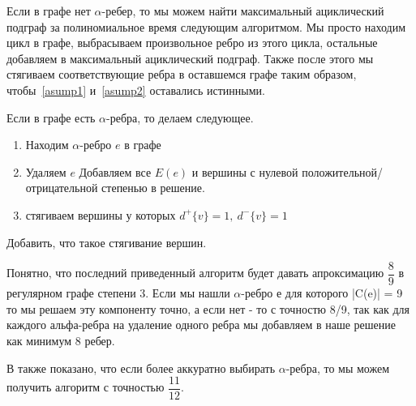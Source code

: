 Если в графе нет $\alpha$-ребер, то мы можем найти максимальный ациклический 
подграф за полиномиальное время следующим алгоритмом. Мы просто находим цикл
в графе, выбрасываем произвольное ребро из этого цикла, остальные добавляем в 
максимальный ациклический подграф. Также после этого мы стягиваем 
соответствующие ребра в оставшемся графе таким образом, чтобы~\ref{asump1}
 и~\ref{asump2} оставались истинными.

Если в графе есть $\alpha$-ребра, то делаем следующее.

\begin{enumerate}
    \item Находим $\alpha$-ребро $e$ в графе
    \item Удаляем $e$ Добавляем все $E(e)$ и вершины с нулевой 
        положительной/отрицательной степенью в решение.
    \item стягиваем вершины у которых $d^+\{v\}=1,~d^-\{v\}=1$
\end{enumerate}

Добавить, что такое стягивание вершин.

Понятно, что последний приведенный алгоритм будет давать апроксимацию 
$\dfrac{8}{9}$ в регулярном графе степени 3. Если мы нашли $\alpha$-ребро е для
которого |C(e)| = 9 то мы решаем эту компоненту точно, а если нет - то с 
точностю 8/9, так как для каждого альфа-ребра на удаление одного ребра мы 
добавляем в наше решение как минимум 8 ребер.

В \cite{digraph_3} также показано, что если более аккуратно выбирать 
$\alpha$-ребра, то мы можем получить алгоритм с точностью $\dfrac{11}{12}$.

